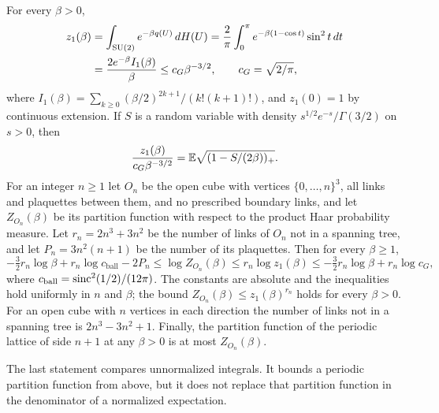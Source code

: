 \begin{lemma}\label{ch03:lem:open-normalization}
For every $\beta>0$,
\[
 \begin{aligned}
 z_1(\beta)&=\int_{\mathrm{SU}(2)}e^{-\beta q(U)}\,dH(U)=\frac2\pi\int_0^\pi e^{-\beta(1-\cos t)}\sin^2t\,dt\\
 &=\frac{2e^{-\beta}I_1(\beta)}\beta\le c_G\beta^{-3/2},\qquad c_G=\sqrt{2/\pi},
 \end{aligned}
\]
where $I_1(\beta)=\sum_{k\ge0}(\beta/2)^{2k+1}/(k!(k+1)!)$, and $z_1(0)=1$ by continuous extension. If $S$ is a random variable with density $s^{1/2}e^{-s}/\Gamma(3/2)$ on $s>0$, then
\[
 \frac{z_1(\beta)}{c_G\beta^{-3/2}}=\mathbb E\sqrt{(1-S/(2\beta))_+}.
\]
For an integer $n\ge1$ let $O_n$ be the open cube with vertices $\{0,\dots,n\}^3$, all links and plaquettes between them, and no prescribed boundary links, and let $Z_{O_n}(\beta)$ be its partition function with respect to the product Haar probability measure. Let $r_n=2n^3+3n^2$ be the number of links of $O_n$ not in a spanning tree, and let $P_n=3n^2(n+1)$ be the number of its plaquettes. Then for every $\beta\ge1$,
\[
 -\tfrac32r_n\log\beta+r_n\log c_{\mathrm{ball}}-2P_n\le\log Z_{O_n}(\beta)\le r_n\log z_1(\beta)\le-\tfrac32r_n\log\beta+r_n\log c_G,
\]
where $c_{\mathrm{ball}}=\operatorname{sinc}^2(1/2)/(12\pi)$. The constants are absolute and the inequalities hold uniformly in $n$ and $\beta$; the bound $Z_{O_n}(\beta)\le z_1(\beta)^{r_n}$ holds for every $\beta>0$. For an open cube with $n$ vertices in each direction the number of links not in a spanning tree is $2n^3-3n^2+1$. Finally, the partition function of the periodic lattice of side $n+1$ at any $\beta>0$ is at most $Z_{O_n}(\beta)$.
\end{lemma}

The last statement compares unnormalized integrals. It bounds a periodic partition function from above, but it does not replace that partition function in the denominator of a normalized expectation.

